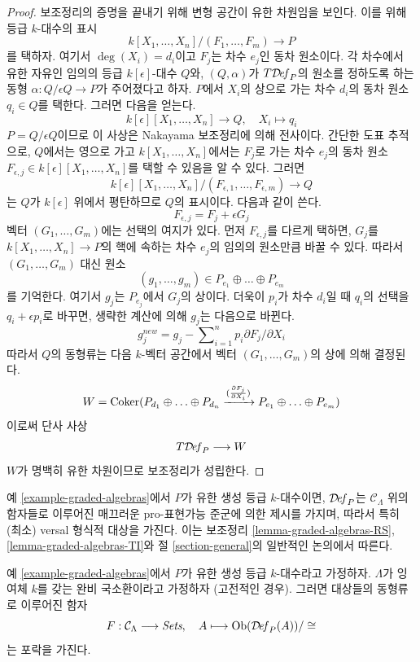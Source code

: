 \begin{proof}
\medskip\noindent
보조정리의 증명을 끝내기 위해 변형 공간이 유한 차원임을 보인다.
이를 위해 등급 $k$-대수의 표시
$$
k[X_1, \ldots, X_n]/(F_1, \ldots, F_m) \longrightarrow P
$$
를 택하자. 여기서 $\deg(X_i) = d_i$이고 $F_j$는 차수 $e_j$인
동차 원소이다. 각 차수에서 유한 자유인 임의의 등급
$k[\epsilon]$-대수 $Q$와, $(Q, \alpha)$가
$T\mathcal{D}\!\mathit{ef}_P$의 원소를 정하도록 하는 동형
$\alpha : Q/\epsilon Q \to P$가 주어졌다고 하자.%
$P$에서 $X_i$의 상으로 가는 차수 $d_i$의 동차 원소 $q_i \in Q$를
택한다. 그러면 다음을 얻는다.
$$
k[\epsilon][X_1, \ldots, X_n] \longrightarrow Q,\quad
X_i \longmapsto q_i
$$
$P = Q/\epsilon Q$이므로 이 사상은 Nakayama 보조정리에 의해 전사이다.
간단한 도표 추적으로, $Q$에서는 영으로 가고
$k[X_1, \ldots, X_n]$에서는 $F_j$로 가는 차수 $e_j$의 동차 원소
$F_{\epsilon, j} \in k[\epsilon][X_1, \ldots, X_n]$를 택할 수 있음을
알 수 있다. 그러면
$$
k[\epsilon][X_1, \ldots, X_n]/(F_{\epsilon, 1}, \ldots, F_{\epsilon, m})
\longrightarrow Q
$$
는 $Q$가 $k[\epsilon]$ 위에서 평탄하므로 $Q$의 표시이다. 다음과 같이 쓴다.
$$
F_{\epsilon, j} =  F_j + \epsilon G_j
$$
벡터 $(G_1, \ldots, G_m)$에는 선택의 여지가 있다. 먼저
$F_{\epsilon, j}$를 다르게 택하면, $G_j$를
$k[X_1, \ldots, X_n] \to P$의 핵에 속하는 차수 $e_j$의 임의의 원소만큼
바꿀 수 있다. 따라서 $(G_1, \ldots, G_m)$ 대신 원소
$$
(g_1, \ldots, g_m) \in P_{e_1} \oplus \ldots \oplus P_{e_m}
$$
를 기억한다. 여기서 $g_j$는 $P_{e_j}$에서 $G_j$의 상이다. 더욱이
$p_i$가 차수 $d_i$일 때 $q_i$의 선택을 $q_i + \epsilon p_i$로 바꾸면,
생략한 계산에 의해 $g_j$는 다음으로 바뀐다.
$$
g_j^{new} = g_j - \sum\nolimits_{i = 1}^n p_i \partial F_j / \partial X_i
$$
따라서 $Q$의 동형류는 다음 $k$-벡터 공간에서 벡터
$(G_1, \ldots, G_m)$의 상에 의해 결정된다.
$$
W  = \mathop{\mathrm{Coker}}(P_{d_1} \oplus \ldots \oplus P_{d_n}
\xrightarrow{(\frac{\partial F_j}{\partial X_i})}
P_{e_1} \oplus \ldots \oplus P_{e_m})
$$
이로써 단사 사상
$$
T\mathcal{D}\!\mathit{ef}_P \longrightarrow W
$$
$W$가 명백히 유한 차원이므로 보조정리가 성립한다.
\end{proof}

\noindent
예 \ref{example-graded-algebras}에서 $P$가 유한 생성 등급 $k$-대수이면,
$\mathcal{D}\!\mathit{ef}_P$는 $\mathcal{C}_\Lambda$ 위의 함자들로 이루어진
매끄러운 pro-표현가능 준군에 의한 제시를 가지며, 따라서 특히
(최소) versal 형식적 대상을 가진다. 이는 보조정리
\ref{lemma-graded-algebras-RS}, \ref{lemma-graded-algebras-TI}와
절 \ref{section-general}의 일반적인 논의에서 따른다.

\begin{lemma}
\label{lemma-graded-algebras-hull}
예 \ref{example-graded-algebras}에서 $P$가 유한 생성 등급 $k$-대수라고
가정하자. $\Lambda$가 잉여체 $k$를 갖는 완비 국소환이라고 가정하자
(고전적인 경우). 그러면 대상들의 동형류로 이루어진 함자
$$
F : \mathcal{C}_\Lambda \longrightarrow \textit{Sets},\quad
A \longmapsto \mathop{\mathrm{Ob}}\nolimits(\mathcal{D}\!\mathit{ef}_P(A))/\cong
$$
는 포락을 가진다.
\end{lemma}

